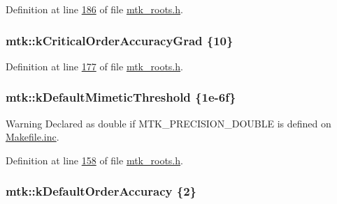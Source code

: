 Definition at line \hyperlink{mtk__roots_8h_source_l00186}{186} of file \hyperlink{mtk__roots_8h_source}{mtk\+\_\+roots.\+h}.

\hypertarget{group__c01-roots_ga295dd2f403c775ecd942c22b5a777496}{
\subsubsection[{k\+Critical\+Order\+Accuracy\+Grad}]{\setlength{\rightskip}{0pt plus 5cm}mtk\+::k\+Critical\+Order\+Accuracy\+Grad \{10\}}}\label{group__c01-roots_ga295dd2f403c775ecd942c22b5a777496}


Definition at line \hyperlink{mtk__roots_8h_source_l00177}{177} of file \hyperlink{mtk__roots_8h_source}{mtk\+\_\+roots.\+h}.

\hypertarget{group__c01-roots_ga35718d949bdc81a08a9cc8ebbe3478a2}{
\subsubsection[{k\+Default\+Mimetic\+Threshold}]{\setlength{\rightskip}{0pt plus 5cm}mtk\+::k\+Default\+Mimetic\+Threshold \{1e-\/6f\}}}\label{group__c01-roots_ga35718d949bdc81a08a9cc8ebbe3478a2}
\begin{DoxyWarning}{Warning}
Declared as double if M\+T\+K\+\_\+\+P\+R\+E\+C\+I\+S\+I\+O\+N\+\_\+\+D\+O\+U\+B\+L\+E is defined on \hyperlink{Makefile_8inc}{Makefile.\+inc}. 
\end{DoxyWarning}


Definition at line \hyperlink{mtk__roots_8h_source_l00158}{158} of file \hyperlink{mtk__roots_8h_source}{mtk\+\_\+roots.\+h}.

\hypertarget{group__c01-roots_ga0d95560098eb36420511103637b6952f}{
\subsubsection[{k\+Default\+Order\+Accuracy}]{\setlength{\rightskip}{0pt plus 5cm}mtk\+::k\+Default\+Order\+Accuracy \{2\}}}\label{group__c01-roots_ga0d95560098eb36420511103637b6952f}


